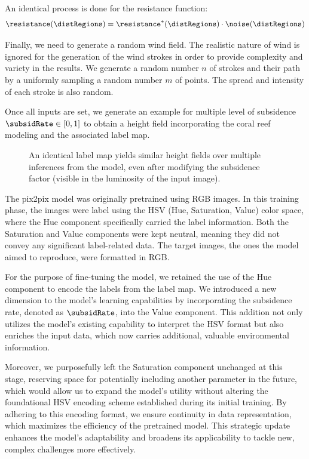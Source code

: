 An identical process is done for the resistance function:
\begin{align}
    \resistance(\distRegions) = \resistance^*(\distRegions) \cdot \noise(\distRegions)
\end{align}

Finally, we need to generate a random wind field. The realistic nature of wind is ignored for the generation of the wind strokes in order to provide complexity and variety in the results. 
We generate a random number $n$ of strokes and their path by a uniformly sampling a random number $m$ of points. The spread and intensity of each stroke is also random.

Once all inputs are set, we generate an example for multiple level of subsidence $\subsidRate \in [0, 1]$ to obtain a height field incorporating the coral reef modeling and the associated label map. 

\begin{figure}
    \caption{An identical label map yields similar height fields over multiple inferences from the model, even after modifying the subsidence factor (visible in the luminosity of the input image).}
    \label{fig:coral-island-results-subsidence}
\end{figure}

The pix2pix model was originally pretrained using RGB images. In this training phase, the images were label using the HSV (Hue, Saturation, Value) color space, where the Hue component specifically carried the label information. Both the Saturation and Value components were kept neutral, meaning they did not convey any significant label-related data. The target images, the ones the model aimed to reproduce, were formatted in RGB.

For the purpose of fine-tuning the model, we retained the use of the Hue component to encode the labels from the label map. We introduced a new dimension to the model's learning capabilities by incorporating the subsidence rate, denoted as $\subsidRate$, into the Value component. This addition not only utilizes the model's existing capability to interpret the HSV format but also enriches the input data, which now carries additional, valuable environmental information.

Moreover, we purposefully left the Saturation component unchanged at this stage, reserving space for potentially including another parameter in the future, which would allow us to expand the model's utility without altering the foundational HSV encoding scheme established during its initial training. By adhering to this encoding format, we ensure continuity in data representation, which maximizes the efficiency of the pretrained model. This strategic update enhances the model's adaptability and broadens its applicability to tackle new, complex challenges more effectively.


